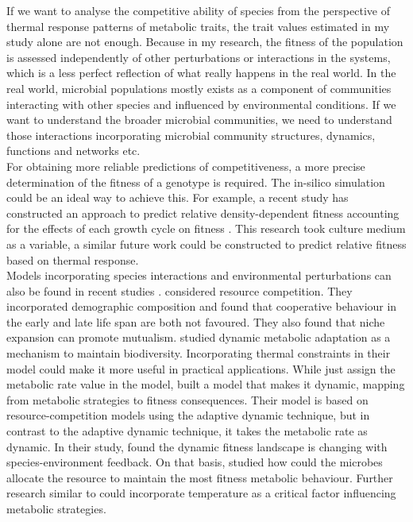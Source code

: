 \documentclass[a4paper]{article}
\begin{document}
If we want to analyse the competitive ability of species from the perspective of thermal response patterns of metabolic traits, the trait values estimated in my study alone are not enough. Because in my research, the fitness of the population is assessed independently of other perturbations or interactions in the systems, which is a less perfect reflection of what really happens in the real world. In the real world, microbial populations mostly exists as a component of communities interacting with other species and influenced by environmental conditions. If we want to understand the broader microbial communities, we need to understand those interactions incorporating microbial community structures, dynamics, functions and networks etc. \\

For obtaining more reliable predictions of competitiveness, a more precise determination of the fitness of a genotype is required. The in-silico simulation could be an ideal way to achieve this. For example, a recent study has constructed an approach to predict relative density-dependent fitness accounting for the effects of each growth cycle on fitness \citep{ram2019predicting}. This research took culture medium as a variable, a similar future work could be constructed to predict relative fitness based on thermal response. \\

Models incorporating species interactions and environmental perturbations can also be found in recent studies \citep{rodrigues2021community, pacciani2020dynamic, li2020modeling}. \citealt{rodrigues2021community} considered resource competition. They incorporated demographic composition and found that cooperative behaviour in the early and late life span are both not favoured. They also found that niche expansion can promote mutualism. \citealt{pacciani2020dynamic} studied dynamic metabolic adaptation as a mechanism to maintain biodiversity. Incorporating thermal constraints in their model could make it more useful in practical applications. While \citealt{pacciani2020dynamic} just assign the metabolic rate value in the model, \citep{li2020modeling} built a model that makes it dynamic, mapping from metabolic strategies to fitness consequences. Their model is based on resource-competition models using the adaptive dynamic technique, but in contrast to the adaptive dynamic technique, it takes the metabolic rate as dynamic. In their study, \citealt{li2020modeling} found the dynamic fitness landscape is changing with species-environment feedback. On that basis, \citealt{li2020modeling} studied how could the microbes allocate the resource to maintain the most fitness metabolic behaviour. Further research similar to \citealt{li2020modeling} could incorporate temperature as a critical factor influencing metabolic strategies. \\ %
\end{document}
